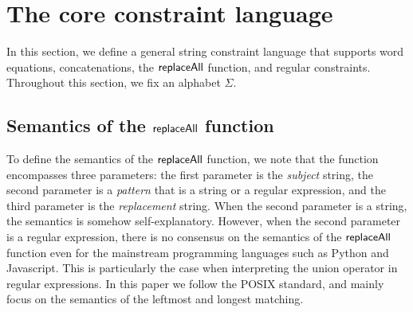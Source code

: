 
\section{The core constraint language}\label{sec-core}

In this section, we define a general string constraint language that supports word equations, concatenations, the $\mathsf{replaceAll}$ function, and regular constraints.  Throughout this section, we fix an alphabet $\Sigma$.



\subsection{Semantics of the $\mathsf{replaceAll}$ function}
To define the semantics of the $\mathsf{replaceAll}$ function, we note that the function encompasses three parameters: the first parameter is the \emph{subject} string, the second parameter is a \emph{pattern} that is a string or a regular expression, and the third parameter is the \emph{replacement} string.  
When the second parameter is a string, the semantics is somehow self-explanatory. However, when the second parameter is a regular expression, there is no consensus on the semantics of the $\mathsf{replaceAll}$ function even for the mainstream programming languages such as Python and Javascript.
 This is particularly the case when interpreting the union operator in regular expressions. In this paper we follow the POSIX standard, and mainly focus on the  semantics of the leftmost and longest matching.


